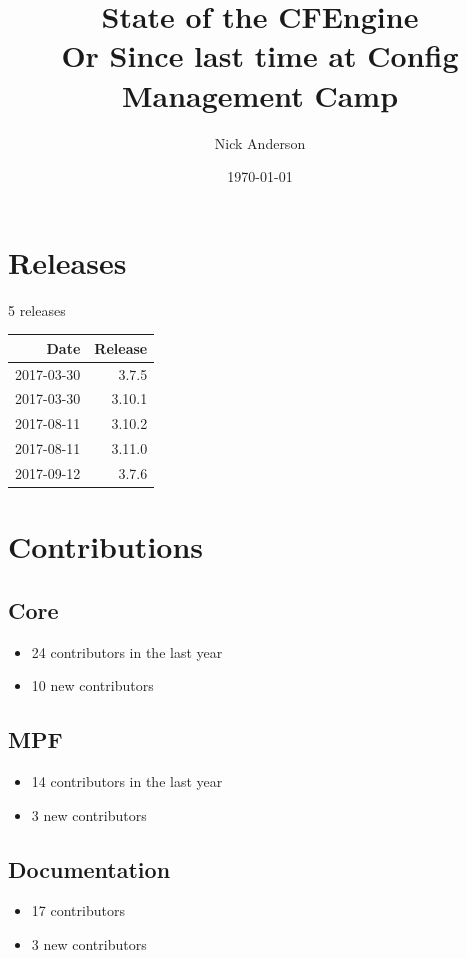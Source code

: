 \documentclass[11pt]{article}
\author{Nick Anderson}
\date{\today}
\title{State of the CFEngine\\\medskip
\large Or Since last time at Config Management Camp}
\begin{document}
\maketitle

\section*{Releases}
\label{sec:org3647df4}
5 releases


\begin{center}
\begin{tabular}{rr}
Date & Release\\
\hline
2017-03-30 & 3.7.5\\
2017-03-30 & 3.10.1\\
2017-08-11 & 3.10.2\\
2017-08-11 & 3.11.0\\
2017-09-12 & 3.7.6\\
\end{tabular}
\end{center}
\section*{Contributions}
\label{sec:orge982660}
\subsection*{Core}
\label{sec:org8061f96}
\begin{itemize}
\item 24 contributors in the last year
\end{itemize}
\begin{itemize}
\item 10 new contributors
\end{itemize}

\subsection*{MPF}
\label{sec:org4cb2a7b}
\begin{itemize}
\item 14 contributors in the last year
\end{itemize}
\begin{itemize}
\item 3 new contributors
\end{itemize}

\subsection*{Documentation}
\label{sec:orgab4f82c}
\begin{itemize}
\item 17 contributors
\item 3 new contributors
\end{itemize}
\end{document}
